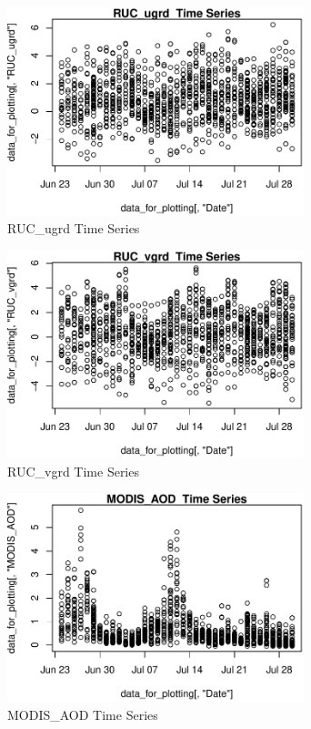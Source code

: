 \begin{figure} 
\centering  
\includegraphics[width=0.77\textwidth]{Code_Outputs/ML_input_report_AllforCaret_cleaned_StepPractice_part_practice_RUC_ugrdTS.pdf} 
\caption{\label{fig:ML_input_report_AllforCaret_cleaned_StepPractice_part_practiceRUC_ugrdTS}RUC_ugrd  Time Series} 
\end{figure} 
 

\begin{figure} 
\centering  
\includegraphics[width=0.77\textwidth]{Code_Outputs/ML_input_report_AllforCaret_cleaned_StepPractice_part_practice_RUC_vgrdTS.pdf} 
\caption{\label{fig:ML_input_report_AllforCaret_cleaned_StepPractice_part_practiceRUC_vgrdTS}RUC_vgrd  Time Series} 
\end{figure} 
 

\begin{figure} 
\centering  
\includegraphics[width=0.77\textwidth]{Code_Outputs/ML_input_report_AllforCaret_cleaned_StepPractice_part_practice_MODIS_AODTS.pdf} 
\caption{\label{fig:ML_input_report_AllforCaret_cleaned_StepPractice_part_practiceMODIS_AODTS}MODIS_AOD  Time Series} 
\end{figure} 
 

